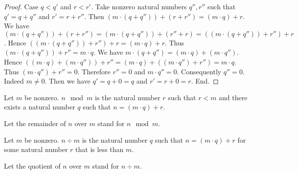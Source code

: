 \documentclass[../../arithmetic.tex]{subfiles}
\begin{document}
\begin{forthel}
\begin{proof}
      Case $q < q'$ and $r < r'$.
        Take nonzero natural numbers $q'',r''$ such that $q' = q + q''$ and $r' = r + r''$.
        Then $(m \cdot (q + q'')) + (r + r'') = (m \cdot q) + r$.
        We have $(m \cdot (q + q'')) + (r + r'') = (m \cdot (q + q'')) + (r'' + r) = ((m \cdot (q + q'')) + r'') + r$.
        Hence $((m \cdot (q + q'')) + r'') + r = (m \cdot q) + r$.
        Thus $(m \cdot (q + q'')) + r'' = m \cdot q$.
        We have $m \cdot (q + q'') = (m \cdot q) + (m \cdot q'')$.
        Hence $((m \cdot q) + (m \cdot q'')) + r'' = (m \cdot q) + ((m \cdot q'') + r'') = m \cdot q$.
        Thus $(m \cdot q'') + r'' = 0$.
        Therefore $r'' = 0$ and $m \cdot q'' = 0$.
        Consequently $q'' = 0$.
        Indeed $m \neq 0$.
        Then we have $q' = q + 0 = q$  and $r' = r + 0 = r$.
      End.
    \end{proof}

    \begin{definition}
      Let $m$ be nonzero.
      $n \mod m$ is the natural number $r$ such that $r < m$ and there exists a natural number $q$ such that $n = (m \cdot q) + r$.
    \end{definition}

    Let the remainder of $n$ over $m$ stand for $n \mod m$.

    \begin{definition}
      Let $m$ be nonzero.
      $n \div m$ is the natural number $q$ such that $n = (m \cdot q) + r$ for some natural number $r$ that is less than $m$.
    \end{definition}

    Let the quotient of $n$ over $m$ stand for $n \div m$.
  \end{forthel}
\end{document}

